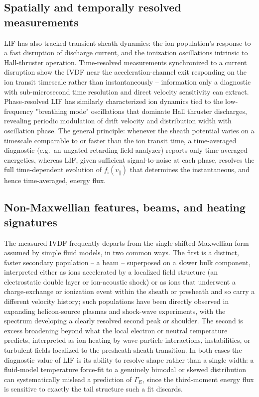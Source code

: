 \subsection{Spatially and temporally resolved measurements}

LIF has also tracked transient sheath dynamics: the ion population's response to a fast disruption of discharge current, and the ionization oscillations intrinsic to Hall-thruster operation. Time-resolved measurements synchronized to a current disruption show the IVDF near the acceleration-channel exit responding on the ion transit timescale rather than instantaneously -- information only a diagnostic with sub-microsecond time resolution and direct velocity sensitivity can extract. Phase-resolved LIF has similarly characterized ion dynamics tied to the low-frequency "breathing mode" oscillations that dominate Hall thruster discharges, revealing periodic modulation of drift velocity and distribution width with oscillation phase. The general principle: whenever the sheath potential varies on a timescale comparable to or faster than the ion transit time, a time-averaged diagnostic (e.g.\ an ungated retarding-field analyzer) reports only time-averaged energetics, whereas LIF, given sufficient signal-to-noise at each phase, resolves the full time-dependent evolution of $f_{\mathrm{i}}(v_{\parallel})$ that determines the instantaneous, and hence time-averaged, energy flux.

\subsection{Non-Maxwellian features, beams, and heating signatures}

The measured IVDF frequently departs from the single shifted-Maxwellian form assumed by simple fluid models, in two common ways. The first is a distinct, faster secondary population -- a beam -- superposed on a slower bulk component, interpreted either as ions accelerated by a localized field structure (an electrostatic double layer or ion-acoustic shock) or as ions that underwent a charge-exchange or ionization event within the sheath or presheath and so carry a different velocity history; such populations have been directly observed in expanding helicon-source plasmas and shock-wave experiments, with the spectrum developing a clearly resolved second peak or shoulder. The second is excess broadening beyond what the local electron or neutral temperature predicts, interpreted as ion heating by wave-particle interactions, instabilities, or turbulent fields localized to the presheath-sheath transition. In both cases the diagnostic value of LIF is its ability to resolve shape rather than a single width: a fluid-model temperature force-fit to a genuinely bimodal or skewed distribution can systematically mislead a prediction of $\Gamma_{E}$, since the third-moment energy flux is sensitive to exactly the tail structure such a fit discards.


